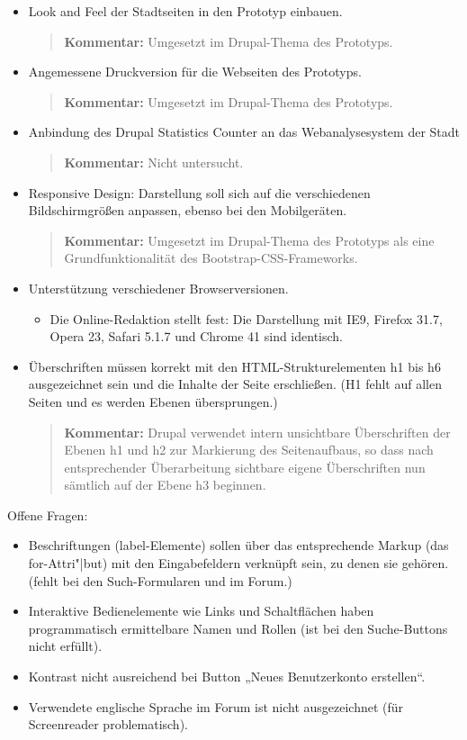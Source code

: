 \documentclass[11pt,a4paper,twoside]{article}
\newcommand{\kommentar}[1]{\begin{quote}\textbf{Kommentar:} #1 \end{quote}}
\begin{document}
\begin{itemize}
\kommentar{Unser Prototyp verwendet wie alle modernen Webapplikationen
  Javascript an verschiedenen Stellen, insbesondere zur visuellen Darstellung,
  und kann deshalb nicht sinnvoll mit deaktiviertem Javascript betrieben
  werden. }

\item Look and Feel der Stadtseiten in den Prototyp einbauen.
\kommentar{Umgesetzt im Drupal-Thema des Prototyps.}
\item Angemessene Druckversion für die Webseiten des Prototyps.
\kommentar{Umgesetzt im Drupal-Thema des Prototyps.}
\item Anbindung des Drupal Statistics Counter an das Webanalysesystem der
  Stadt
\kommentar{Nicht untersucht.}
\item Responsive Design: Darstellung soll sich auf die verschiedenen
  Bildschirmgrößen anpassen, ebenso bei den Mobilgeräten. 
\kommentar{Umgesetzt im Drupal-Thema des Prototyps als eine Grundfunktionalität
  des Bootstrap-CSS-Frameworks.}

\item Unterstützung verschiedener Browserversionen.
  \begin{itemize}
  \item Die Online-Redaktion stellt fest: Die Darstellung mit IE9, Firefox
    31.7, Opera 23, Safari 5.1.7 und Chrome 41 sind identisch.
  \end{itemize}
\item Überschriften müssen korrekt mit den HTML-Strukturelementen h1 bis h6
  ausgezeichnet sein und die Inhalte der Seite erschließen. (H1 fehlt auf
  allen Seiten und es werden Ebenen übersprungen.)

\kommentar{Drupal verwendet intern unsichtbare Überschriften der Ebenen h1 und
  h2 zur Markierung des Seitenaufbaus, so dass nach entsprechender
  Überarbeitung sichtbare eigene Überschriften nun sämtlich auf der Ebene h3
  beginnen. }
\end{itemize}
Offene Fragen:
\begin{itemize}
\item Beschriftungen (label-Elemente) sollen über das entsprechende Markup
  (das for-Attri"|but) mit den Eingabefeldern verknüpft sein, zu denen sie
  gehören. (fehlt bei den Such-Formularen und im Forum.)
\item Interaktive Bedienelemente wie Links und Schaltflächen haben
  programmatisch ermittelbare Namen und Rollen (ist bei den Suche-Buttons
  nicht erfüllt).
\item Kontrast nicht ausreichend bei Button „Neues Benutzerkonto erstellen“.
\item Verwendete englische Sprache im Forum ist nicht ausgezeichnet (für
  Screenreader problematisch).
\end{itemize}
\end{document}
